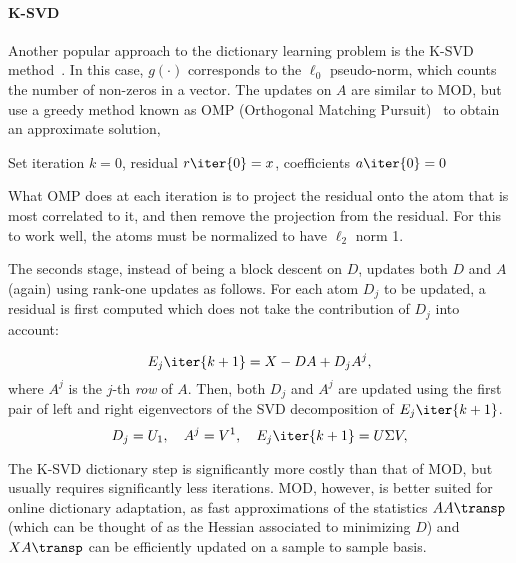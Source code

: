 \documentclass[a4paper,11pt]{article}
\begin{document}
\paragraph{K-SVD} Another popular approach to the dictionary learning problem is the  K-SVD method~\cite{ksvd}. In this case, $g(\cdot)$ corresponds to the $\ell_0$ pseudo-norm, which counts the number of non-zeros in a vector. The updates on $A$ are similar to MOD, but use a greedy method known as OMP (Orthogonal Matching Pursuit)~\cite{omp} to obtain an approximate solution,


\begin{algorithm}[ht]
Set iteration $k=0$, residual $r\iter{0}=x$, coefficients $a\iter{0}=0$\;
\label{alg:omp}
\end{algorithm}

What OMP does at each iteration is to project the residual onto the atom that is most correlated to it, and then remove the projection from the residual. For this to work well, the atoms must be normalized to have $\ell_2$ norm 1.

The seconds stage, instead of being a block descent on $D$, updates both $D$ and $A$ (again) using rank-one updates as follows. For each atom $D_j$ to be updated, a residual is first computed which does not take the contribution of $D_j$ into account:

\begin{equation}
E_j\iter{k+1} = X - DA + D_jA^j,
\label{eq:ksvd2}
\end{equation}
where $A^j$ is the $j$-th \emph{row} of $A$. Then, both $D_j$ and $A^j$ are updated using the first pair of left and right eigenvectors of the SVD decomposition of $E_j\iter{k+1}$. 
\begin{equation}
D_j = U_1,\quad A^j=V^1,\quad E_j\iter{k+1} = U\Sigma V,
\label{eq:ksvd3}
\end{equation}

The K-SVD dictionary step is significantly more costly than that of MOD, but usually requires significantly less iterations. MOD, however, is better suited for online dictionary adaptation, as fast approximations of the statistics $AA\transp$ (which can be thought of as the Hessian associated to minimizing $D$)  and $XA\transp$ can be efficiently updated on a sample to sample basis.
\end{document}
